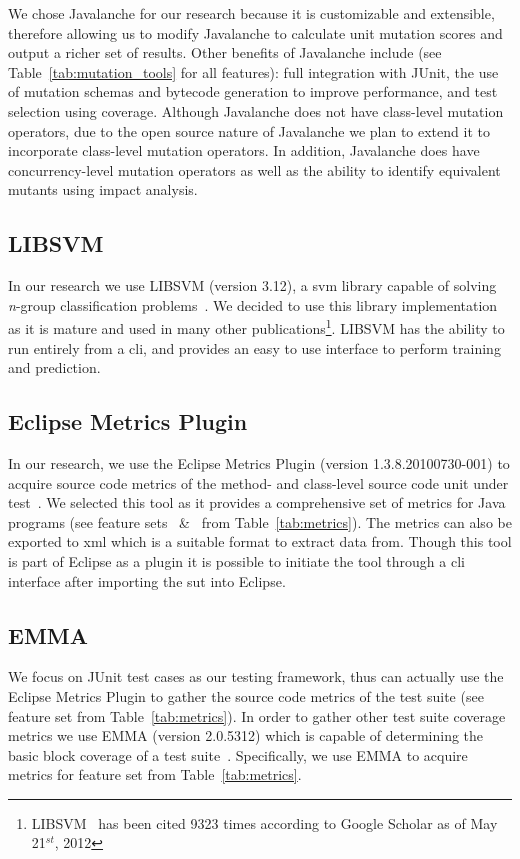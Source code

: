 We chose Javalanche for our research because it is customizable and extensible, therefore allowing us to modify Javalanche to calculate unit mutation scores and output a richer set of results. Other benefits of Javalanche include (see Table~\ref{tab:mutation_tools} for all features): full integration with JUnit, the use of mutation schemas and bytecode generation to improve performance, and test selection using coverage. Although Javalanche does not have class-level mutation operators, due to the open source nature of Javalanche we plan to extend it to incorporate class-level mutation operators. In addition, Javalanche does have concurrency-level mutation operators as well as the ability to identify equivalent mutants using impact analysis.


\subsection{LIBSVM}
\label{subsec:approach_libsvm}
In our research we use LIBSVM (version 3.12), a \gls{svm} library capable of solving \emph{n}-group classification problems~\cite{CL11}. We decided to use this library implementation as it is mature and used in many other publications\footnote{LIBSVM~\cite{CL11} has been cited 9323 times according to Google Scholar as of May 21$^{st}$, 2012}. LIBSVM has the ability to run entirely from a \gls{cli}, and provides an easy to use interface to perform training and prediction.


\subsection{Eclipse Metrics Plugin}
\label{subsec:approach_metrics_plugin}
In our research, we use the Eclipse Metrics Plugin (version 1.3.8.20100730-001) to acquire source code metrics of the method- and class-level source code unit under test~\cite{Metrics}. We selected this tool as it provides a comprehensive set of metrics for Java programs (see feature sets ~\&~ from Table~\ref{tab:metrics}). The metrics can also be exported to \gls{xml} which is a suitable format to extract data from. Though this tool is part of Eclipse as a plugin it is possible to initiate the tool through a \gls{cli} interface after importing the \gls{sut} into Eclipse.


\subsection{EMMA}
\label{subsec:approach_emma}
We focus on JUnit test cases as our testing framework, thus can actually use the Eclipse Metrics Plugin to gather the source code metrics of the test suite (see feature set  from Table~\ref{tab:metrics}). In order to gather other test suite coverage metrics we use EMMA (version 2.0.5312) which is capable of determining the basic block coverage of a test suite~\cite{EMMA}. Specifically, we use EMMA to acquire metrics for feature set  from Table~\ref{tab:metrics}.


